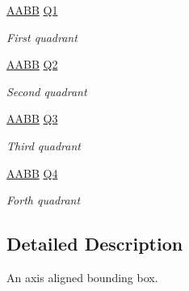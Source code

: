 \begin{DoxyCompactItemize}
\hyperlink{struct_farseer_physics_1_1_collision_1_1_a_a_b_b}{A\+A\+B\+B} \hyperlink{struct_farseer_physics_1_1_collision_1_1_a_a_b_b_a1f429bfa132dd57a12a2f32257c9b07c}{Q1}
\begin{DoxyCompactList}\small\item\em First quadrant \end{DoxyCompactList}\item 
\hyperlink{struct_farseer_physics_1_1_collision_1_1_a_a_b_b}{A\+A\+B\+B} \hyperlink{struct_farseer_physics_1_1_collision_1_1_a_a_b_b_a561951ca97081d28bb2df45b98b1ffd4}{Q2}
\begin{DoxyCompactList}\small\item\em Second quadrant \end{DoxyCompactList}\item 
\hyperlink{struct_farseer_physics_1_1_collision_1_1_a_a_b_b}{A\+A\+B\+B} \hyperlink{struct_farseer_physics_1_1_collision_1_1_a_a_b_b_ada20115bacc6796b36769ac4abca4131}{Q3}
\begin{DoxyCompactList}\small\item\em Third quadrant \end{DoxyCompactList}\item 
\hyperlink{struct_farseer_physics_1_1_collision_1_1_a_a_b_b}{A\+A\+B\+B} \hyperlink{struct_farseer_physics_1_1_collision_1_1_a_a_b_b_a53e6c86a8bcda02bafcf080ba8a6a417}{Q4}
\begin{DoxyCompactList}\small\item\em Forth quadrant \end{DoxyCompactList}\end{DoxyCompactItemize}


\subsection{Detailed Description}
An axis aligned bounding box. 



